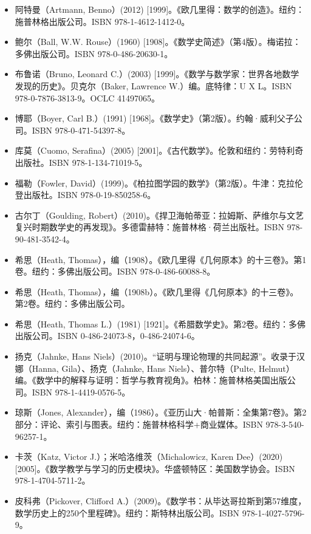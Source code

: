 \begin{itemize}
\item 阿特曼（Artmann, Benno）(2012) [1999]。《欧几里得：数学的创造》。纽约：施普林格出版公司。ISBN 978-1-4612-1412-0。  
\item 鲍尔（Ball, W.W. Rouse）(1960) [1908]。《数学史简述》（第4版）。梅诺拉：多佛出版公司。ISBN 978-0-486-20630-1。  
\item 布鲁诺（Bruno, Leonard C.）(2003) [1999]。《数学与数学家：世界各地数学发现的历史》。贝克尔（Baker, Lawrence W.）编。底特律：U X L。ISBN 978-0-7876-3813-9。OCLC 41497065。
\item 博耶（Boyer, Carl B.）(1991) [1968]。《数学史》（第2版）。约翰·威利父子公司。ISBN 978-0-471-54397-8。  
\item 库莫（Cuomo, Serafina）(2005) [2001]。《古代数学》。伦敦和纽约：劳特利奇出版社。ISBN 978-1-134-71019-5。  
\item 福勒（Fowler, David）(1999)。《柏拉图学园的数学》（第2版）。牛津：克拉伦登出版社。ISBN 978-0-19-850258-6。  
\item 古尔丁（Goulding, Robert）(2010)。《捍卫海帕蒂亚：拉姆斯、萨维尔与文艺复兴时期数学史的再发现》。多德雷赫特：施普林格·荷兰出版社。ISBN 978-90-481-3542-4。  
\item 希思（Heath, Thomas），编（1908）。《欧几里得《几何原本》的十三卷》。第1卷。纽约：多佛出版公司。ISBN 978-0-486-60088-8。
\item 希思（Heath, Thomas），编（1908b）。《欧几里得《几何原本》的十三卷》。第2卷。纽约：多佛出版公司。  
\item 希思（Heath, Thomas L.）(1981) [1921]。《希腊数学史》。第2卷。纽约：多佛出版公司。ISBN 0-486-24073-8，0-486-24074-6。  
\item 扬克（Jahnke, Hans Niels）(2010)。“证明与理论物理的共同起源”。收录于汉娜（Hanna, Gila）、扬克（Jahnke, Hans Niels）、普尔特（Pulte, Helmut）编。《数学中的解释与证明：哲学与教育视角》。柏林：施普林格美国出版公司。ISBN 978-1-4419-0576-5。
\item 琼斯（Jones, Alexander），编（1986）。《亚历山大·帕普斯：全集第7卷》。第2部分：评论、索引与图表。纽约：施普林格科学+商业媒体。ISBN 978-3-540-96257-1。  
\item 卡茨（Katz, Victor J.）；米哈洛维茨（Michalowicz, Karen Dee）(2020) [2005]。《数学教学与学习的历史模块》。华盛顿特区：美国数学协会。ISBN 978-1-4704-5711-2。  
\item 皮科弗（Pickover, Clifford A.）(2009)。《数学书：从毕达哥拉斯到第57维度，数学历史上的250个里程碑》。纽约：斯特林出版公司。ISBN 978-1-4027-5796-9。

\end{itemize}

